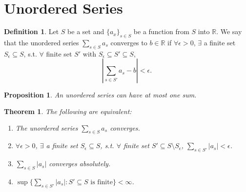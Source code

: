 \documentclass[12pt]{article}
\theoremstyle{plain}
\newtheorem{thm}{Theorem}
\newtheorem*{prop}{Proposition}
\theoremstyle{definition}
\newtheorem*{defn}{Definition}
\begin{document}
\section*{Unordered Series}
\begin{defn}
    Let $S$ be a set and $\{a_x\}_{s\in S}$ be a function from $S$ into $\mathbb{R}$.
    We say that the unordered series $\sum_{s\in S}a_s$ converges to $b\in\mathbb{R}$ if $\forall
    \epsilon>0$, $\exists$ a finite set $S_\epsilon\subseteq S$, s.t. $\forall$ finite set $S'$ with
    $S_\epsilon\subseteq S'\subseteq S$,
    \[\left| \sum_{s\in S'}a_s-b\right| < \epsilon.\]
\end{defn}
\begin{prop}
    An unordered series can have at most one sum.
\end{prop}

\begin{thm}
    The following are equivalent:
    \begin{enumerate}
        \item The unordered series $\sum_{s\in S}a_s$ converges.
        \item $\forall \epsilon>0$, $\exists$ a finite set $S_\epsilon\subseteq S$, s.t. $\forall$ finite
        set $S'\subseteq S\setminus S_\epsilon$, $\sum_{s\in S'}|a_s|<\epsilon$.
        \item $\sum_{s\in S}|a_s|$ converges absolutely.
        \item $\sup\{\sum_{s\in S'} |a_s| : S'\subseteq S \text{ is finite}\} < \infty$.
    \end{enumerate}
\end{thm}
\end{document}
